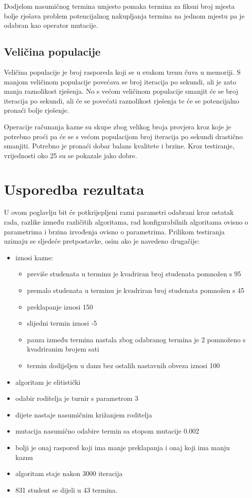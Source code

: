 \documentclass[times, utf8, zavrsni]{fer}
\begin{document}
Dodjelom nasumičnog termina umjesto pomaka termina za fiksni broj mjesta bolje rješava problem potencijalnog nakupljanja termina na jednom mjestu pa je odabran kao operator mutacije.

\section{Veličina populacije}

Veličina populacije je broj rasporeda koji se u svakom trenu čuva u memoriji. S manjom veličinom populacije povećava se broj iteracija po sekundi, ali je zato manja raznolikost rješenja. No s većom veličinom populacije smanjit će se broj iteracija po sekundi, ali će se povećati raznolikost rješenja te će se potencijalno pronaći bolje rješenje.

Operacije računanja kazne su skupe zbog velikog broja provjera kroz koje je potrebno proći pa će se s većom populacijom broj iteracija po sekundi drastično smanjiti. Potrebno je pronaći dobar balans kvalitete i brzine. Kroz testiranje, vrijednosti oko 25 su se pokazale jako dobre.

\chapter{Usporedba rezultata}

U ovom poglavlju bit će potkrijepljeni razni parametri odabrani kroz ostatak rada, razlike između različitih algoritama, rad konfigurabilnih algoritama ovisno o parametrima i brzina izvođenja ovisno o parametrima. Prilikom testiranja uzimaju se sljedeće pretpostavke, osim ako je navedeno drugačije:

\begin{itemize}
	\item iznosi kazne:
	\begin{itemize}
		\item previše studenata u terminu je kvadriran broj studenata pomnožen s 95
		\item premalo studenata u terminu  je kvadriran broj studenata pomnožen s 45
		\item preklapanje iznosi 150
		\item slijedni termin iznosi -5
		\item pauza između termina nastala zbog odabranog termina je 2 pomnoženo s kvadriranim brojem sati
		\item termin dodijeljen u danu bez ostalih nastavnih obveza iznosi 100
	\end{itemize}	
	\item algoritam je elitistički
	\item odabir roditelja je turnir s parametrom 3
	\item dijete nastaje nasumičnim križanjem roditelja
	\item mutacija nasumično odabire termin sa stopom mutacije 0.002
	\item bolji je onaj raspored koji ima manje preklapanja i onaj koji ima manju kaznu
	\item algoritam staje nakon 3000 iteracija
	\item 831 student se dijeli u 43 termina.
\end{itemize}
\end{document}
